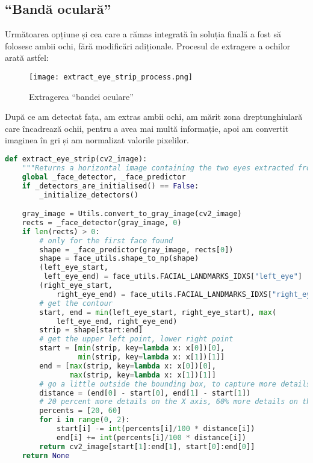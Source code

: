 \subsection{``Bandă oculară''}
Următoarea opțiune și cea care a rămas integrată în soluția finală a fost să folosesc ambii ochi, fără modificări adiționale.
Procesul de extragere a ochilor arată astfel:

\begin{figure}[h]
    \centering
    \texttt{[image: extract\_eye\_strip\_process.png]}
    \caption{Extragerea ``bandei oculare''}
    \label{fig_extracting_eye_strip}
\end{figure}

După ce am detectat fața, am extras ambii ochi, am mărit zona dreptunghiulară care încadrează ochii, pentru a avea mai multă informație, apoi am convertit imaginea în gri și am normalizat valorile pixelilor.

\begin{lstlisting}[language=Python, caption=Extragerea ``bandei oculare'' în Python3]
def extract_eye_strip(cv2_image):
    """Returns a horizontal image containing the two eyes extracted from the image"""
    global _face_detector, _face_predictor
    if _detectors_are_initialised() == False:
        _initialize_detectors()

    gray_image = Utils.convert_to_gray_image(cv2_image)
    rects = _face_detector(gray_image, 0)
    if len(rects) > 0:
        # only for the first face found
        shape = _face_predictor(gray_image, rects[0])
        shape = face_utils.shape_to_np(shape)
        (left_eye_start,
         left_eye_end) = face_utils.FACIAL_LANDMARKS_IDXS["left_eye"]
        (right_eye_start,
            right_eye_end) = face_utils.FACIAL_LANDMARKS_IDXS["right_eye"]
        # get the contour
        start, end = min(left_eye_start, right_eye_start), max(
            left_eye_end, right_eye_end)
        strip = shape[start:end]
        # get the upper left point, lower right point
        start = [min(strip, key=lambda x: x[0])[0],
                 min(strip, key=lambda x: x[1])[1]]
        end = [max(strip, key=lambda x: x[0])[0],
               max(strip, key=lambda x: x[1])[1]]
        # go a little outside the bounding box, to capture more details
        distance = (end[0] - start[0], end[1] - start[1])
        # 20 percent more details on the X axis, 60% more details on the Y axis
        percents = [20, 60]
        for i in range(0, 2):
            start[i] -= int(percents[i]/100 * distance[i])
            end[i] += int(percents[i]/100 * distance[i])
        return cv2_image[start[1]:end[1], start[0]:end[0]]
    return None

\end{lstlisting}